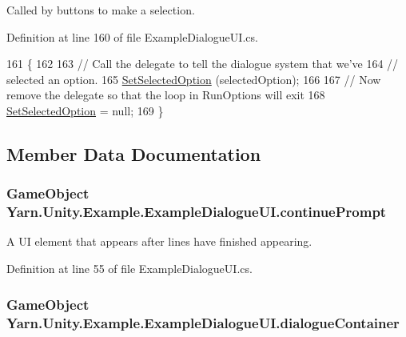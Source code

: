 Called by buttons to make a selection. 



Definition at line 160 of file Example\-Dialogue\-U\-I.\-cs.


\begin{DoxyCode}
161         \{
162 
163             \textcolor{comment}{// Call the delegate to tell the dialogue system that we've}
164             \textcolor{comment}{// selected an option.}
165             \hyperlink{a00095_a558f60ef9a7bcf887f015ba0d27aa6ef}{SetSelectedOption} (selectedOption);
166 
167             \textcolor{comment}{// Now remove the delegate so that the loop in RunOptions will exit}
168             \hyperlink{a00095_a558f60ef9a7bcf887f015ba0d27aa6ef}{SetSelectedOption} = null; 
169         \}
\end{DoxyCode}


\subsection{Member Data Documentation}
\hypertarget{a00095_a74367b77a6a5218fa47dbe1d6266e4c6}{
\subsubsection[{continue\-Prompt}]{\setlength{\rightskip}{0pt plus 5cm}Game\-Object Yarn.\-Unity.\-Example.\-Example\-Dialogue\-U\-I.\-continue\-Prompt}}\label{a00095_a74367b77a6a5218fa47dbe1d6266e4c6}


A U\-I element that appears after lines have finished appearing. 



Definition at line 55 of file Example\-Dialogue\-U\-I.\-cs.

\hypertarget{a00095_a2eaebc844d2ca982ec078708d070dbd3}{
\subsubsection[{dialogue\-Container}]{\setlength{\rightskip}{0pt plus 5cm}Game\-Object Yarn.\-Unity.\-Example.\-Example\-Dialogue\-U\-I.\-dialogue\-Container}}\label{a00095_a2eaebc844d2ca982ec078708d070dbd3}


